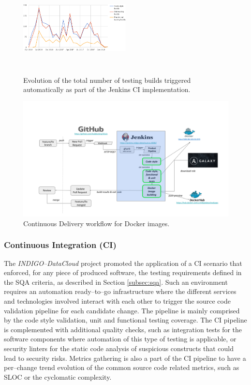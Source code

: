 \documentclass[journal]{IEEEtran}
\begin{document}
\begin{figure}[ht]
\centering
\includegraphics[width=0.5\textwidth, height=50mm]{images/jenkins_CI_builds.png}
\caption{Evolution of the total number of testing builds triggered automatically as part of the Jenkins CI implementation.}
\label{fig:fig_jenkins_CI_builds}
\end{figure}

\begin{figure}[ht]
\centering
\includegraphics[width=\textwidth]{images/devops.png}
\caption{Continuous Delivery workflow for Docker images.}
\label{fig:fig_CD}
\end{figure}


\subsubsection{Continuous Integration (CI)}
\label{subsec:ci}

The {\sl INDIGO--DataCloud} project promoted the application of a CI scenario that enforced,
for any piece of produced software, the testing requirements defined in the SQA criteria,
as described in Section \ref{subsec:sqa}. Such an environment requires an automation
ready--to--go infrastructure where the different services and technologies involved interact with each
other to trigger the source code validation pipeline for each candidate change. The
pipeline is mainly comprised by the code style validation, unit and functional testing
coverage. The CI pipeline is complemented with additional quality checks, such as
integration tests for the software components where automation of this type of testing
is applicable, or security linters for the static code analysis of suspicious
constructs that could lead to security risks. Metrics gathering is also a part of
the CI pipeline to have a per--change trend evolution of the common source code
related metrics, such as SLOC or the cyclomatic complexity.
\end{document}

